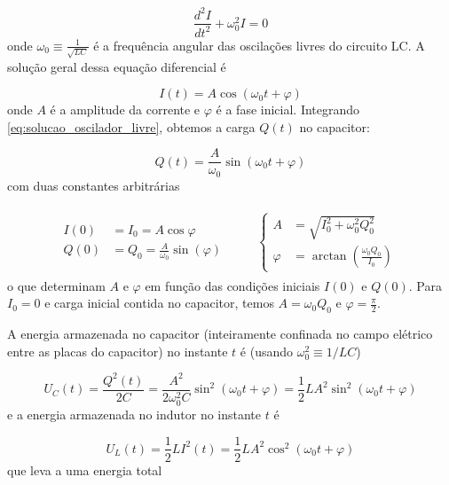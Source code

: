 \documentclass{article}
\begin{document}
\begin{equation}
    \frac{d^2I}{dt^2} + \omega_0^2 I = 0
\end{equation} onde \(\displaystyle \omega_0 \equiv \frac{1}{\sqrt{LC}}\) é a frequência angular das oscilações livres do circuito LC. A solução geral dessa equação diferencial é

\begin{equation}\label{eq:solucao_oscilador_livre}
    \boxed{I(t) = A \cos(\omega_0 t + \varphi)}
\end{equation} onde \(A\) é a amplitude da corrente e \(\varphi\) é a fase inicial. Integrando \eqref{eq:solucao_oscilador_livre}, obtemos a carga \(Q(t)\) no capacitor:

\begin{equation}
    \boxed{Q(t) = \frac{A}{\omega_0} \sin(\omega_0 t + \varphi)}
\end{equation} com duas constantes arbitrárias

\begin{align}
    \begin{aligned}
        I(0) &= I_0 = A \cos \varphi \\
        Q(0) &= Q_0 = \frac{A}{\omega_0} \sin(\varphi)
        \end{aligned}
    \qquad
    \begin{aligned}\begin{cases}
        A &= \sqrt{I_0^2 + \omega_0^2 Q_0^2} \\
        \varphi &= \arctan \left( \frac{\omega_0 Q_0}{I_0} \right)
    \end{cases}\end{aligned}
\end{align} o que determinam \(A\) e \(\varphi\) em função das condições iniciais \(I(0)\) e \(Q(0)\). Para \(I_0 = 0\) e carga inicial contida no capacitor, temos \(A = \omega_0 Q_0\) e \(\varphi = \frac{\pi}{2}\).

A energia armazenada no capacitor (inteiramente confinada no campo elétrico entre as placas do capacitor) no instante \(t\) é (usando \(\omega_0^2 \equiv 1/LC\))

\begin{equation}
    \boxed{U_C(t) = \frac{Q^2(t)}{2C} = \frac{A^2}{2\omega_0^2 C} \sin^2(\omega_0 t + \varphi) = \frac{1}{2}LA^2 \sin^2(\omega_0 t + \varphi)}
\end{equation} e a energia armazenada no indutor no instante \(t\) é

\begin{equation}
    \boxed{U_L(t) = \frac{1}{2}LI^2(t) = \frac{1}{2}LA^2 \cos^2(\omega_0 t + \varphi)}
\end{equation} que leva a uma energia total 
\end{document}

